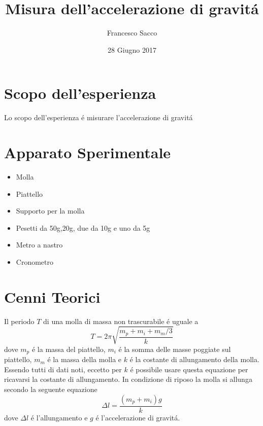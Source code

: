 \documentclass{exam}
\date{28 Giugno 2017}
\title{Misura dell'accelerazione di gravit\'a}
\author{Francesco Sacco}
\begin{document}
	\maketitle
	\section{Scopo dell'esperienza}
		Lo scopo dell'esperienza \'e misurare l'accelerazione di gravit\'a

	\section{Apparato Sperimentale}
		\begin{itemize}
			\item Molla
			\item Piattello
			\item Supporto per la molla
			\item Pesetti da 50g,20g, due da 10g e uno da 5g
			\item Metro a nastro
			\item Cronometro
		\end{itemize}
	\section{Cenni Teorici}
		Il periodo $T$ di una molla di massa non trascurabile \'e uguale a 
		\begin{equation}
			T=2\pi \sqrt{\frac{m_p+m_i+m_m/3}{k}} 
		\end{equation}
		dove $m_p$ \'e la massa del piattello, $m_i$ \'e la somma delle masse poggiate sul piattello, $m_m$ \'e la massa della molla e $k$ \'e la costante di allungamento della molla.\newline
		Essendo tutti di dati noti, eccetto per $k$ \'e possibile usare questa equazione per ricavarsi la costante di allungamento.\newline\newline
		In condizione di riposo la molla si allunga secondo la seguente equazione		
		\begin{equation}
			\Delta l=\frac{(m_p+m_i)g}{k}
		\end{equation}
		dove $\Delta l$ \'e l'allungamento e $g$ \'e l'accelerazione di gravit\'a.\newpage
\end{document}
